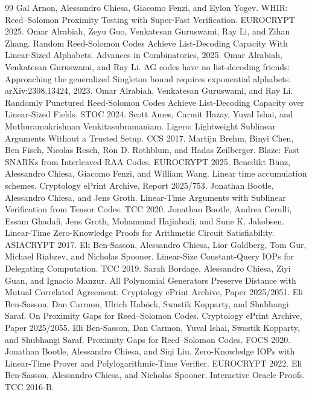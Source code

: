 \documentclass[11pt]{article}
\theoremstyle{plain}
\theoremstyle{definition}
\begin{document}
\begin{thebibliography}{99}
 Gal Arnon, Alessandro Chiesa, Giacomo Fenzi, and Eylon Yogev. WHIR: Reed--Solomon Proximity Testing with Super-Fast Verification. EUROCRYPT 2025.
 Omar Alrabiah, Zeyu Guo, Venkatesan Guruswami, Ray Li, and Zihan Zhang. Random Reed-Solomon Codes Achieve List-Decoding Capacity With Linear-Sized Alphabets. Advances in Combinatorics, 2025.
 Omar Alrabiah, Venkatesan Guruswami, and Ray Li. AG codes have no list-decoding friends: Approaching the generalized Singleton bound requires exponential alphabets. arXiv:2308.13424, 2023.
 Omar Alrabiah, Venkatesan Guruswami, and Ray Li. Randomly Punctured Reed-Solomon Codes Achieve List-Decoding Capacity over Linear-Sized Fields. STOC 2024.
 Scott Ames, Carmit Hazay, Yuval Ishai, and Muthuramakrishnan Venkitasubramaniam. Ligero: Lightweight Sublinear Arguments Without a Trusted Setup. CCS 2017.
 Martijn Brehm, Binyi Chen, Ben Fisch, Nicolas Resch, Ron D. Rothblum, and Hadas Zeilberger. Blaze: Fast SNARKs from Interleaved RAA Codes. EUROCRYPT 2025.
 Benedikt B\"unz, Alessandro Chiesa, Giacomo Fenzi, and William Wang. Linear time accumulation schemes. Cryptology ePrint Archive, Report 2025/753.
 Jonathan Bootle, Alessandro Chiesa, and Jens Groth. Linear-Time Arguments with Sublinear Verification from Tensor Codes. TCC 2020.
 Jonathan Bootle, Andrea Cerulli, Essam Ghadafi, Jens Groth, Mohammad Hajiabadi, and Sune K. Jakobsen. Linear-Time Zero-Knowledge Proofs for Arithmetic Circuit Satisfiability. ASIACRYPT 2017.
 Eli Ben-Sasson, Alessandro Chiesa, Lior Goldberg, Tom Gur, Michael Riabzev, and Nicholas Spooner. Linear-Size Constant-Query IOPs for Delegating Computation. TCC 2019.
 Sarah Bordage, Alessandro Chiesa, Ziyi Guan, and Ignacio Manzur. All Polynomial Generators Preserve Distance with Mutual Correlated Agreement. Cryptology ePrint Archive, Paper 2025/2051.
 Eli Ben-Sasson, Dan Carmon, Ulrich Hab\"ock, Swastik Kopparty, and Shubhangi Saraf. On Proximity Gaps for Reed--Solomon Codes. Cryptology ePrint Archive, Paper 2025/2055.
 Eli Ben-Sasson, Dan Carmon, Yuval Ishai, Swastik Kopparty, and Shubhangi Saraf. Proximity Gaps for Reed--Solomon Codes. FOCS 2020.
 Jonathan Bootle, Alessandro Chiesa, and Siqi Liu. Zero-Knowledge IOPs with Linear-Time Prover and Polylogarithmic-Time Verifier. EUROCRYPT 2022.
 Eli Ben-Sasson, Alessandro Chiesa, and Nicholas Spooner. Interactive Oracle Proofs. TCC 2016-B.

\end{thebibliography}
\end{document}
